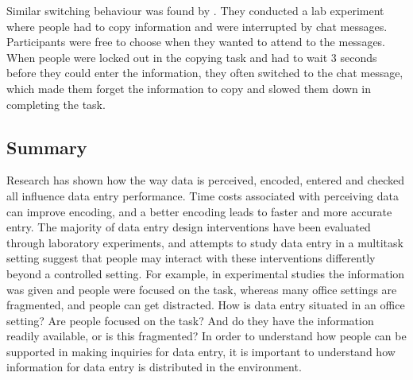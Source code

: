 Similar switching behaviour was found by \citet{Katidioti2013}. They conducted a lab experiment where people had to copy information and were interrupted by chat messages. Participants were free to choose when they wanted to attend to the messages. When people were locked out in the copying task and had to wait 3 seconds before they could enter the information, they often switched to the chat message, which made them forget the information to copy and slowed them down in completing the task.


\subsection{Summary}
Research has shown how the way data is perceived, encoded, entered and checked all influence data entry performance. Time costs associated with perceiving data can improve encoding, and a better encoding leads to faster and more accurate entry.  The majority of data entry design interventions have been evaluated through laboratory experiments, and attempts to study data entry in a multitask setting suggest that people may interact with these interventions differently beyond a controlled setting. For example, in experimental studies the information was given and people were focused on the task, whereas many office settings are fragmented, and people can get distracted. How is data entry situated in an office setting? Are people focused on the task? And do they have the information readily available, or is this fragmented? In order to understand how people can be supported in making inquiries for data entry, it is important to understand how information for data entry is distributed in the environment.

